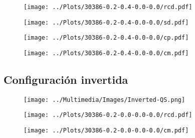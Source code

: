 \documentclass{beamer}
\begin{document}
\begin{frame}
    \begin{figure}
        \centering
        \texttt{[image: ../Plots/30386-0.2-0.4-0.0-0.0/rcd.pdf]}
    \end{figure}
\end{frame}

\begin{frame}
    \begin{figure}
        \centering
        \texttt{[image: ../Plots/30386-0.2-0.4-0.0-0.0/sd.pdf]}
    \end{figure}
\end{frame}

\begin{frame}
    \begin{figure}
        \centering
        \texttt{[image: ../Plots/30386-0.2-0.4-0.0-0.0/cp.pdf]}
    \end{figure}
\end{frame}

\begin{frame}
    \begin{figure}
        \centering
        \texttt{[image: ../Plots/30386-0.2-0.4-0.0-0.0/cm.pdf]}
    \end{figure}
\end{frame}

\subsection{Configuración invertida}

\begin{frame}
    \begin{figure}
        \centering
        \texttt{[image: ../Multimedia/Images/Inverted-QS.png]}
    \end{figure}
\end{frame}

\begin{frame}
    \begin{figure}
        \centering
        \texttt{[image: ../Plots/30386-0.2-0.0-0.0-0.0/rcd.pdf]}
    \end{figure}
\end{frame}

\begin{frame}
    \begin{figure}
        \centering
        \texttt{[image: ../Plots/30386-0.2-0.0-0.0-0.0/cm.pdf]}
    \end{figure}
\end{frame}
\end{document}

